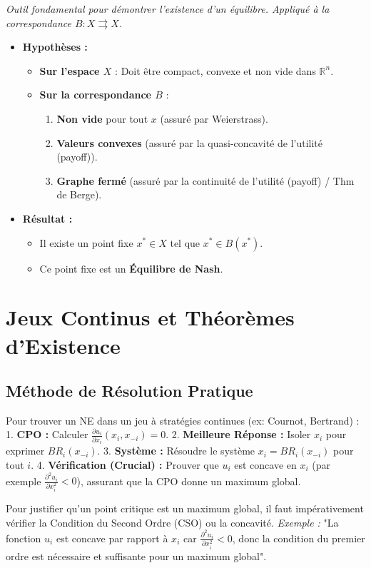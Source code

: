 \documentclass[10pt,a4paper]{article}
\begin{document}
\begin{tcolorbox}[colback=white, title=\textbf{2. Théorème du Point Fixe de Kakutani}]
\textit{Outil fondamental pour démontrer l'existence d'un équilibre. Appliqué à la correspondance $B : X \rightrightarrows X$.}
\begin{itemize}
    \item \textbf{Hypothèses :}
    \begin{itemize}
        \item \textbf{Sur l'espace $X$} : Doit être compact, convexe et non vide dans $\mathbb{R}^n$.
        \item \textbf{Sur la correspondance $B$} :
        \begin{enumerate}
            \item \textbf{Non vide} pour tout $x$ (assuré par Weierstrass).
            \item \textbf{Valeurs convexes} (assuré par la quasi-concavité de l'utilité (payoff)).
            \item \textbf{Graphe fermé} (assuré par la continuité de l'utilité (payoff) / Thm de Berge).
        \end{enumerate}
    \end{itemize}
    \item \textbf{Résultat :}
    \begin{itemize}
        \item Il existe un point fixe $x^* \in X$ tel que $x^* \in B(x^*)$.
        \item Ce point fixe est un \textbf{Équilibre de Nash}.
    \end{itemize}
\end{itemize}
\end{tcolorbox}

\section{Jeux Continus et Théorèmes d'Existence}

\subsection{Méthode de Résolution Pratique}
Pour trouver un NE dans un jeu à stratégies continues (ex: Cournot, Bertrand) :
1. \textbf{CPO :} Calculer $\frac{\partial u_i}{\partial x_i}(x_i, x_{-i}) = 0$.
2. \textbf{Meilleure Réponse :} Isoler $x_i$ pour exprimer $BR_i(x_{-i})$.
3. \textbf{Système :} Résoudre le système $x_i = BR_i(x_{-i})$ pour tout $i$.
4. \textbf{Vérification (Crucial) :} Prouver que $u_i$ est concave en $x_i$ (par exemple $\frac{\partial^2 u_i}{\partial x_i^2} < 0$), assurant que la CPO donne un maximum global.
\begin{tcolorbox}[colback=yellow!10, title=Rigueur CPO/CSO]
Pour justifier qu'un point critique est un maximum global, il faut impérativement vérifier la Condition du Second Ordre (CSO) ou la concavité.
\textit{Exemple :} "La fonction $u_i$ est concave par rapport à $x_i$ car $\frac{\partial^2 u_i}{\partial x_i^2} < 0$, donc la condition du premier ordre est nécessaire et suffisante pour un maximum global".
\end{tcolorbox}
\end{document}
